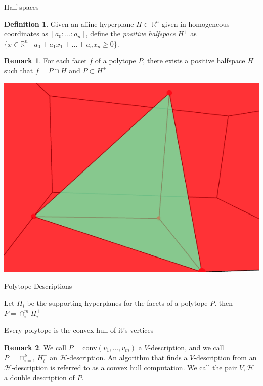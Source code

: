 \documentclass[9pt]{beamer}
\theoremstyle{definition}
\newtheorem{remark}{Remark}
\newtheorem{defn}{Definition}
\begin{document}
\begin{frame}[fragile]{Half-spaces}
  \begin{defn}
    Given an affine hyperplane $H \subset \mathbb{R}^n$ given in homogeneous
    coordinates as $[a_0 : \dots : a_n]$, define the \emph{positive halfspace}
    $H^+$ as $\{x \in \mathbb{R}^n \mid a_0 + a_1x_1 + \dots + a_nx_n \geq 0 \}$.
  \end{defn}

  \begin{remark}
    For each facet $f$ of a polytope $P$, there exists a positive halfspace $H^+$
    such that $f = P \cap H$ and $ P \subset H^+$
  \end{remark}

  \begin{center}
    \includegraphics[width=.30\textwidth, height=0.4\textheight]{images/half-space}
  \end{center}
\end{frame}

\begin{frame}[fragile]{Polytope Descriptions}
  \begin{theorem}
    Let $H_i$ be the supporting hyperplanes for the facets of a polytope $P$.
    then $P = \cap_i^m H_i^+$
  \end{theorem}
  \begin{theorem}
    Every polytope is the convex hull of it's vertices
  \end{theorem}
  \begin{remark}
    We call $P =  \text{conv}(v_1, \dots, v_m)$ a $V$-description, and
    we call $P =  \cap_{i=1}^kH_i^+$ an $\mathcal{H}$-description. An algorithm
    that finds a $V$-description from an $\mathcal{H}$-description is referred to as a convex
    hull computation. We call the pair ${V, \mathcal{H} }$ a double description of $P$.
  \end{remark}
\end{frame}
\end{document}
